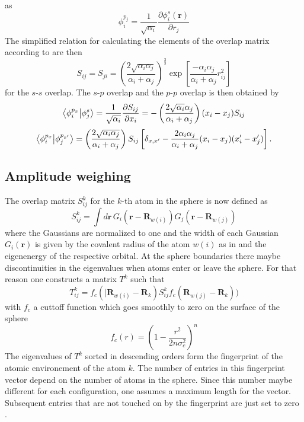 as
\begin{equation}\phi_i^{p_j}=\frac{1}{\sqrt{\alpha_i}}\frac{\partial\phi_i^s(\mathbf{r})}{\partial r_j}\end{equation}
The simplified relation for calculating the elements of the overlap matrix according to \citeauthor{Clementi1966} \cite{Clementi1966} are then
\begin{equation}
\label{ovrlap}
S_{ij}=S_{ji}=\left(\frac{2\sqrt{\alpha_i\alpha_j}}{\alpha_i+\alpha_j}\right)^\frac{3}{2}\exp\left[\frac{-\alpha_i\alpha_j}{\alpha_i+\alpha_j}r_{ij}^2\right]\end{equation}
for the $s$-$s$ overlap. The $s$-$p$ overlap and the $p$-$p$ overlap is then obtained by
\begin{equation}\bra{\phi_i^{p_x}}\ket{\phi_j^s}=\\ \frac{1}{\sqrt{\alpha_i}}\frac{\partial S_{ij}}{\partial x_i}=-\left(\frac{2\sqrt{\alpha_i}\alpha_j}{\alpha_i+\alpha_j}\right)(x_i-x_j)S_{ij}\end{equation}
\begin{equation}\bra{\phi_i^{p_x}}\ket{\phi_j^{p_{x'}}}=\left(\frac{2\sqrt{\alpha_i\alpha_j}}{\alpha_i+\alpha_j}\right)S_{ij}\left[\delta_{x,x'}-\frac{2\alpha_i\alpha_j}{\alpha_i+\alpha_j}(x_i-x_j)(x'_i-x'_j)\right].\end{equation}

\subsection{Amplitude weighing}
The overlap matrix $S^k_{ij}$ for the $k$-th atom in the sphere is now defined as
\begin{equation}S^k_{ij}=\int d\mathbf{r}\, G_i(\mathbf{r}-\mathbf{R}_{w(i)})G_j(\mathbf{r}-\mathbf{R}_{w(j)})\end{equation}
where the Gaussians are normalized to one and the width of each Gaussian $G_i(\mathbf{r})$ is given by the covalent radius of the atom $w(i)$ as in \cite{Zhu2016} and the eigenenergy of the respective orbital. At the sphere boundaries there maybe discontinuities in the eigenvalues when atoms enter or leave the sphere. For that reason one constructs a matrix $T^k$ such that
\begin{equation}T^k_{ij}=f_c(|\mathbf{R}_{w(i)}-\mathbf{R}_k)S^k_{ij}f_c(\mathbf{R}_{w(j)}-\mathbf{R}_k))\end{equation}
with $f_c$ a cuttoff function which goes smoothly to zero on the surface of the sphere
\begin{equation}f_c(r)=\left(1-\frac{r^2}{2n\sigma_c^2}\right)^n\end{equation}
The eigenvalues of $T^k$ sorted in descending orders form the fingerprint of the atomic environement of the atom $k$. The number of entries in this fingerprint vector depend on the number of atoms in the sphere. Since this number maybe different for each configuration, one assumes a maximum length for the vector. Subsequent entries that are not touched on by the fingerprint are just set to zero \cite{Zhu2016}.
